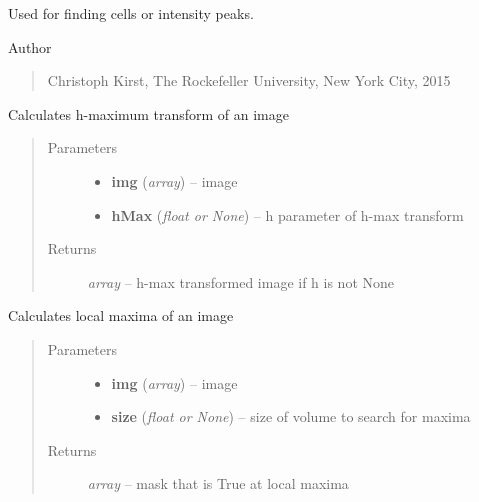 \documentclass[letterpaper,10pt,english]{sphinxmanual}
\begin{document}
Used for finding cells or intensity peaks.

Author
\begin{quote}

Christoph Kirst, The Rockefeller University, New York City, 2015
\end{quote}

\begin{fulllineitems}
\label{api/ClearMap.ImageProcessing:ClearMap.ImageProcessing.MaximaDetection.hMaxTransform}
Calculates h-maximum transform of an image
\begin{quote}\begin{description}
\item[{Parameters}] \leavevmode\begin{itemize}
\item {} 
\textbf{img} (\emph{array}) --
image

\item {} 
\textbf{hMax} (\emph{float or None}) --
h parameter of h-max transform

\end{itemize}

\item[{Returns}] \leavevmode
\emph{array} --
h-max transformed image if h is not None

\end{description}\end{quote}

\end{fulllineitems}


\begin{fulllineitems}
\label{api/ClearMap.ImageProcessing:ClearMap.ImageProcessing.MaximaDetection.localMax}
Calculates local maxima of an image
\begin{quote}\begin{description}
\item[{Parameters}] \leavevmode\begin{itemize}
\item {} 
\textbf{img} (\emph{array}) --
image

\item {} 
\textbf{size} (\emph{float or None}) --
size of volume to search for maxima

\end{itemize}

\item[{Returns}] \leavevmode
\emph{array} --
mask that is True at local maxima

\end{description}\end{quote}

\end{fulllineitems}
\end{document}
